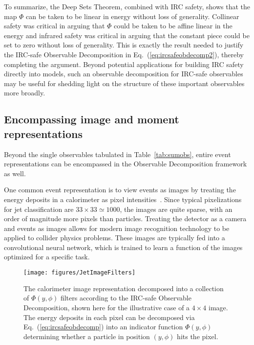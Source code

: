 \documentclass[letterpaper,11pt]{article}
\DeclareRobustCommand{\Tab}[1]{Table~\ref{#1}}
\DeclareRobustCommand{\Eq}[1]{Eq.~(\ref{#1})}
\begin{document}
To summarize, the Deep Sets Theorem, combined with IRC safety, shows that the map $\Phi$ can be taken to be linear in energy without loss of generality.
%
Collinear safety was critical in arguing that $\Phi$ could be taken to be affine linear in the energy and infrared safety was critical in arguing that the constant piece could be set to zero without loss of generality.
%
This is exactly the result needed to justify the IRC-safe Observable Decomposition in \Eq{eq:ircsafeobdecomp2}, thereby completing the argument.
%
Beyond potential applications for building IRC safety directly into models, such an observable decomposition for IRC-safe observables may be useful for shedding light on the structure of these important observables more broadly.


\subsection{Encompassing image and moment representations}
\label{sec:encompass}

Beyond the single observables tabulated in \Tab{tab:sumobs}, entire event representations can be encompassed in the Observable Decomposition framework as well.

One common event representation is to view events as images by treating the energy deposits in a calorimeter as pixel intensities~\cite{Cogan:2014oua,deOliveira:2015xxd,Baldi:2016fql,Barnard:2016qma,Komiske:2016rsd,ATL-PHYS-PUB-2017-017}.
%
Since typical pixelizations for jet classification are $33\times 33 \simeq 1000$, the images are quite sparse, with an order of magnitude more pixels than particles.
%
Treating the detector as a camera and events as images allows for modern image recognition technology to be applied to collider physics problems.
%
These images are typically fed into a convolutional neural network, which is trained to learn a function of the images optimized for a specific task.


\begin{figure}[t]
\centering
\texttt{[image: figures/JetImageFilters]}
\caption{The calorimeter image representation decomposed into a collection of $\Phi(y,\phi)$ filters according to the IRC-safe Observable Decomposition, shown here for the illustrative case of a $4\times4$ image.
%
The energy deposits in each pixel can be decomposed via \Eq{eq:ircsafeobdecomp} into an indicator function $\Phi(y,\phi)$ determining whether a particle in position $(y,\phi)$ hits the pixel.}
\label{fig:jetimagefilters}
\end{figure}
\end{document}
